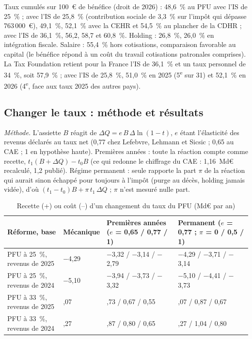 Taux cumulés sur 100~€ de bénéfice (droit de 2026) : 48,6~\% au PFU avec l'IS de 25~\% ; avec l'IS de 25,8~\%
(contribution sociale de 3,3~\% sur l'impôt qui dépasse 763\,000~€), 49,1~\%, 52,1~\% avec la CEHR et 54,5~\% au
plancher de la CDHR ; avec l'IS de 36,1~\%, 56,2, 58,7 et 60,8~\%. Holding : 26,8~\%, 26,0~\% en intégration
fiscale. Salaire : 55,4~\% hors cotisations, comparaison favorable au capital (le bénéfice répond à un coût du travail
cotisations patronales comprises). La Tax Foundation retient pour la France l'IS
de 36,1~\% et un taux personnel de 34~\%, soit 57,9~\% ; avec l'IS de 25,8~\%, 51,0~\% en 2025 (5\textsuperscript{e}
sur 31) et 52,1~\% en 2026 (4\textsuperscript{e}, face aux taux 2025 des autres pays).



\subsection{Changer le taux : méthode et résultats}

\emph{Méthode.} L'assiette $B$ réagit de $\Delta Q = e\,B\,\Delta\ln(1-t)$, $e$ étant l'élasticité des revenus
déclarés au taux net (0,77 chez Lefebvre, Lehmann et Sicsic ; 0,65 au CAE ; 1 en hypothèse haute). Premières années :
toute la réaction compte comme recette, $t_1(B+\Delta Q) - t_0 B$ (ce qui redonne le chiffrage du CAE : 1,16~Md€
recalculé, 1,2 publié). Régime permanent : seule rapporte la part $\pi$ de la réaction qui aurait sinon échappé pour
toujours à l'impôt (purge au décès, holding jamais vidée), d'où $(t_1-t_0)B + \pi\,t_1\,\Delta Q$ ; $\pi$ n'est
mesuré nulle part.

\begin{table}[!htbp]\centering\scriptsize
\caption{Recette (+) ou coût (--) d'un changement du taux du PFU (Md€ par an)}\label{tab:pfu_a_taux}
\begin{tabularx}{\linewidth}{@{}>{\raggedright\arraybackslash}X>{\raggedleft\arraybackslash}p{1.4cm}>{\raggedleft\arraybackslash}p{3.2cm}>{\raggedleft\arraybackslash}p{3.3cm}@{}}
\toprule
Réforme, base & Mécanique & Premières années ($e$ = 0,65 / 0,77 / 1) & Permanent ($e$ = 0,77 ; $\pi$ = 0 / 0,5 / 1) \\
\midrule
PFU à 25~\%, revenus de 2025 & $-$4,29 & $-$3,32 / $-$3,14 / $-$2,79 & $-$4,29 / $-$3,71 / $-$3,14 \\
PFU à 25~\%, revenus de 2024 & $-$5,10 & $-$3,94 / $-$3,73 / $-$3,32 & $-$5,10 / $-$4,41 / $-$3,73 \\
PFU à 33~\%, revenus de 2025 & 1,07 & 0,73 / 0,67 / 0,55 & 1,07 / 0,87 / 0,67 \\
PFU à 33~\%, revenus de 2024 & 1,27 & 0,87 / 0,80 / 0,65 & 1,27 / 1,04 / 0,80 \\
\bottomrule
\end{tabularx}
\end{table}

